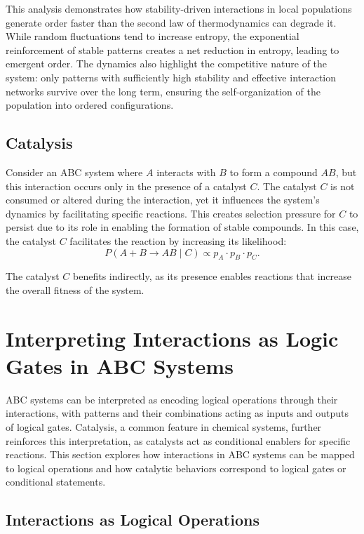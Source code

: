 \documentclass[entropy,article,submit,pdftex,moreauthors]{Definitions/mdpi}
\begin{document}
This analysis demonstrates how stability-driven interactions in local populations generate order faster than the second law of thermodynamics can degrade it. While random fluctuations tend to increase entropy, the exponential reinforcement of stable patterns creates a net reduction in entropy, leading to emergent order. The dynamics also highlight the competitive nature of the system: only patterns with sufficiently high stability and effective interaction networks survive over the long term, ensuring the self-organization of the population into ordered configurations.

\subsection{Catalysis}

Consider an ABC system where \( A \) interacts with \( B \) to form a compound \( AB \), but this interaction occurs only in the presence of a catalyst \( C \). The catalyst \( C \) is not consumed or altered during the interaction, yet it influences the system's dynamics by facilitating specific reactions. This creates selection pressure for \( C \) to persist due to its role in enabling the formation of stable compounds. In this case, the catalyst \( C \) facilitates the reaction by increasing its likelihood:
\[
P(A + B \to AB \mid C) \propto p_A \cdot p_B \cdot p_C.
\]

The catalyst \( C \) benefits indirectly, as its presence enables reactions that increase the overall fitness of the system.

\section{Interpreting Interactions as Logic Gates in ABC Systems}

ABC systems can be interpreted as encoding logical operations through their interactions, with patterns and their combinations acting as inputs and outputs of logical gates. Catalysis, a common feature in chemical systems, further reinforces this interpretation, as catalysts act as conditional enablers for specific reactions. This section explores how interactions in ABC systems can be mapped to logical operations and how catalytic behaviors correspond to logical gates or conditional statements.

\subsection{Interactions as Logical Operations}
\end{document}
